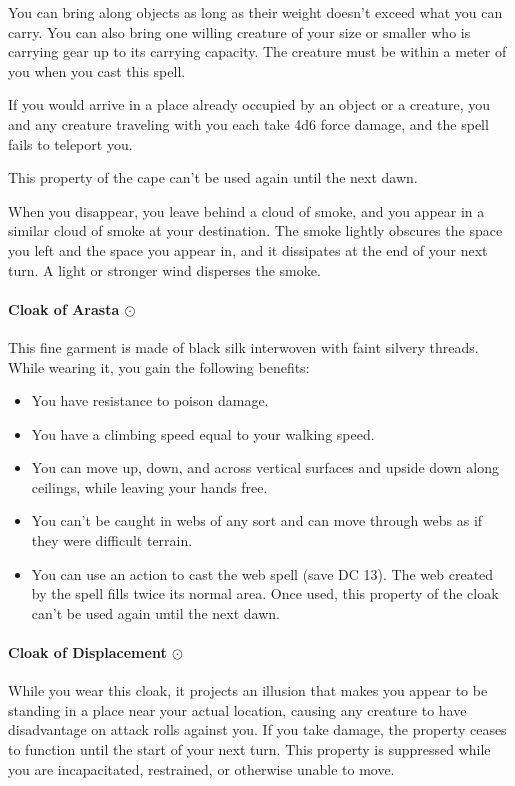         You can bring along objects as long as their weight doesn't exceed what you can carry.
        You can also bring one willing creature of your size or smaller who is carrying gear up to its carrying capacity.
        The creature must be within a meter of you when you cast this spell.

        If you would arrive in a place already occupied by an object or a creature, you and any creature traveling with you each take 4d6 force damage, and the spell fails to teleport you.

        This property of the cape can't be used again until the next dawn.

        When you disappear, you leave behind a cloud of smoke, and you appear in a similar cloud of smoke at your destination.
        The smoke lightly obscures the space you left and the space you appear in, and it dissipates at the end of your next turn. A light or stronger wind disperses the smoke.
    \paragraph{Cloak of Arasta $\odot$}
        This fine garment is made of black silk interwoven with faint silvery threads.
        While wearing it, you gain the following benefits:
        \begin{itemize}
            \item You have resistance to poison damage.
            \item You have a climbing speed equal to your walking speed.
            \item You can move up, down, and across vertical surfaces and upside down along ceilings, while leaving your hands free.
            \item You can't be caught in webs of any sort and can move through webs as if they were difficult terrain.
            \item You can use an action to cast the web spell (save DC 13).
            The web created by the spell fills twice its normal area.
            Once used, this property of the cloak can't be used again until the next dawn.
        \end{itemize}
    \paragraph{Cloak of Displacement $\odot$}
        While you wear this cloak, it projects an illusion that makes you appear to be standing in a place near your actual location, causing any creature to have disadvantage on attack rolls against you.
        If you take damage, the property ceases to function until the start of your next turn.
        This property is suppressed while you are incapacitated, restrained, or otherwise unable to move.
